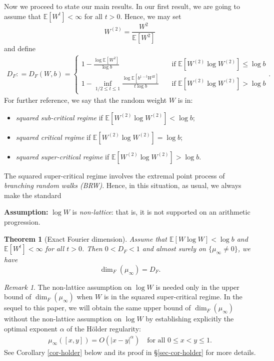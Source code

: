 \documentclass[12pt]{amsart}
\newtheorem{theorem}{Theorem}[section]
\theoremstyle{definition}
\theoremstyle{remark}
\newtheorem{remark}{Remark}[section]
\newcommand{\E}{\mathbb{E}}
\numberwithin{equation}{section}
\begin{document}
Now we proceed to state our main results.  In our first result, we are going to assume that $\E[W^t]<\infty$ for all $t>0$.  Hence, we may set 
\[
W^{(2)} =\frac{ W^2}{\E[W^2]}
\]
and 
define 
\begin{align}\label{def-DF}
D_F: = D_F(W, b) = \left\{
\begin{array}{lc}
\displaystyle 1 - \frac{\log \E[W^2]}{\log b} & \quad \text{if $\E [ W^{(2)}\log W^{(2)}] \le \log b$}
\\
\displaystyle 1 -   \inf_{1/2\le t\le 1} \frac{\log  \E[b^{1-t}W^{2t}]}{ t \log b} & \quad \text{if $\E [ W^{(2)}\log W^{(2)}] >\log b$}
\end{array}
\right. .
\end{align}
For further reference, we say that the random weight $W$ is in: 
\begin{itemize}
\item {\it squared sub-critical regime}  if $\E[W^{(2)}\log W^{(2)}]< \log b$; 
\item {\it squared critical regime} if $\E[W^{(2)}\log W^{(2)}] =  \log b$;  
\item {\it squared super-critical regime} if $\E[W^{(2)}\log W^{(2)}]>\log b$. 
\end{itemize}
 The  squared super-critical regime  involves the extremal point process of  {\it branching random walks (BRW)}. Hence, in this situation, as usual, we always make  the standard
 
{\bf \flushleft Assumption:}
$\log W$ is {\it non-lattice}: that is, it is not supported on an arithmetic progression.


\begin{theorem}[Exact Fourier dimension]\label{thm-fourier}
Assume that $\E[W\log W]<\log b$ and $\E[W^t]<\infty$ for all $t>0$.   Then $0< D_F<1$ and  almost surely on $\{\mu_\infty\ne 0\}$,  we have 
\[
\dim_{F}(\mu_\infty)  = D_F.
\]
\end{theorem}

\begin{remark}\label{rem-non-lattice}
The non-lattice assumption  on $\log W$  is needed only in the upper bound of $\dim_F(\mu_\infty)$ when $W$ is  in the squared super-critical regime.  In the sequel to this paper,  we will obtain the same upper bound of $\dim_F(\mu_\infty)$ without the non-lattice assumption on $\log W$   by establishing explicitly  the optimal  exponent  $\alpha$ of the  H\"older regularity: 
\begin{align}\label{Hol-optimal}
\mu_\infty([x,y]) = O (|x-y|^{\alpha})  \quad \text{for all  $0\le x<y \le 1$.} 
\end{align}
 See  Corollary \ref{cor-holder} below and its proof in \S \ref{sec-cor-holder} for more details. 
\end{remark}
\end{document}
